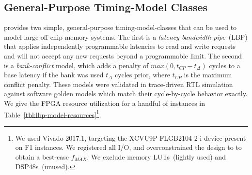 
\vspace{-0.05in}
\subsection{General-Purpose Timing-Model Classes}\label{sec:timing_model}

\PNAME provides two simple, general-purpose timing-model-classes that can be used to
model large off-chip memory systems. The first is a \emph{latency-bandwidth
pipe}~(LBP) that applies independently programmable latencies to read and write
requests and will not accept any new requests beyond a programmable limit. The
second is a \emph{bank-conflict} model, which adds a penalty of $max(0, t_{CP} -
t_{\Delta})$ cycles to a base latency if the bank was used
$t_{\Delta}$ cycles prior, where $t_{CP}$ is the maximum conflict penalty.
These models were validated in trace-driven RTL simulation against
software golden models which match their cycle-by-cycle behavior exactly.  We
give the FPGA resource utilization for a handful of
instances in Table~\ref{tbl:lbp-model-resources}\footnote{We
used Vivado 2017.1, targeting the XCVU9P-FLGB2104-2-i device present on F1
instances. We registered all I/O, and overconstrained the design
to  to obtain a best-case $f_{MAX}$. We exclude memory
LUTs~(lightly used) and DSP48s~(unused).}.

